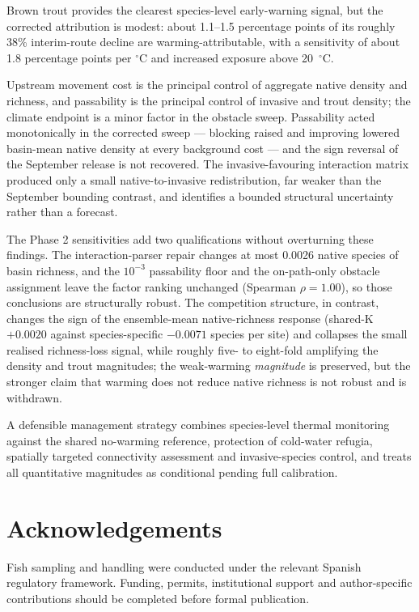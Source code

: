 \documentclass[11pt,a4paper]{article}
\begin{document}
Brown trout provides the clearest species-level early-warning signal, but the corrected attribution is modest: about 1.1--1.5 percentage points of its roughly 38\% interim-route decline are warming-attributable, with a sensitivity of about 1.8 percentage points per $^\circ$C and increased exposure above 20~$^\circ$C.

Upstream movement cost is the principal control of aggregate native density and richness, and passability is the principal control of invasive and trout density; the climate endpoint is a minor factor in the obstacle sweep. Passability acted monotonically in the corrected sweep --- blocking raised and improving lowered basin-mean native density at every background cost --- and the sign reversal of the September release is not recovered. The invasive-favouring interaction matrix produced only a small native-to-invasive redistribution, far weaker than the September bounding contrast, and identifies a bounded structural uncertainty rather than a forecast.

The Phase 2 sensitivities add two qualifications without overturning these findings. The interaction-parser repair changes at most 0.0026 native species of basin richness, and the $10^{-3}$ passability floor and the on-path-only obstacle assignment leave the factor ranking unchanged (Spearman $\rho=1.00$), so those conclusions are structurally robust. The competition structure, in contrast, changes the sign of the ensemble-mean native-richness response (shared-K $+0.0020$ against species-specific $-0.0071$ species per site) and collapses the small realised richness-loss signal, while roughly five- to eight-fold amplifying the density and trout magnitudes; the weak-warming \emph{magnitude} is preserved, but the stronger claim that warming does not reduce native richness is not robust and is withdrawn.

A defensible management strategy combines species-level thermal monitoring against the shared no-warming reference, protection of cold-water refugia, spatially targeted connectivity assessment and invasive-species control, and treats all quantitative magnitudes as conditional pending full calibration.

\section{Acknowledgements}

Fish sampling and handling were conducted under the relevant Spanish regulatory framework. Funding, permits, institutional support and author-specific contributions should be completed before formal publication.
\end{document}

